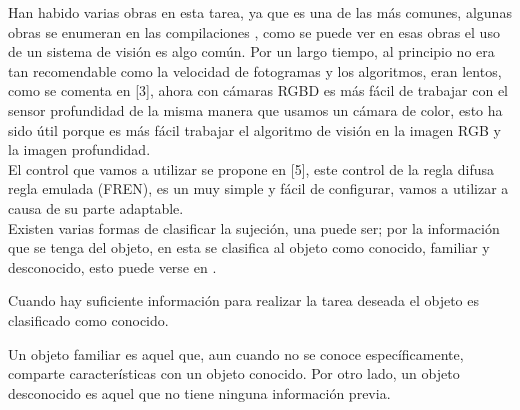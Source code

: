 Han habido varias obras en esta tarea, ya que es una de las más comunes, algunas obras se enumeran en las compilaciones \cite{carlos2013survey}, como se puede ver en esas obras el uso de un sistema de visión es algo común. Por un largo tiempo, al principio no era tan recomendable como la velocidad de fotogramas y los algoritmos, eran lentos, como se comenta en [3], ahora con cámaras RGBD es más fácil de trabajar con el sensor profundidad de la misma manera que usamos un cámara de color, esto ha sido útil porque es más fácil trabajar el algoritmo de visión en la imagen RGB y la imagen profundidad. \\
El control que vamos a utilizar se propone en [5], este control de la regla difusa regla emulada (FREN), es un muy simple y fácil de configurar, vamos a utilizar a causa de su parte adaptable. \\

Existen varias formas de clasificar la sujeción, una puede ser; por la información que se tenga del objeto, en esta se clasifica al objeto como conocido, familiar y desconocido, esto puede verse en \cite{bohg2014data,el20113d,carlos2013survey,zaharescuobject}.

Cuando hay suficiente información para realizar la tarea deseada el objeto es clasificado como conocido.

Un objeto familiar es aquel que, aun cuando no se conoce específicamente, comparte características con un objeto conocido. Por otro lado, un objeto desconocido es aquel que no tiene ninguna información previa. \\

